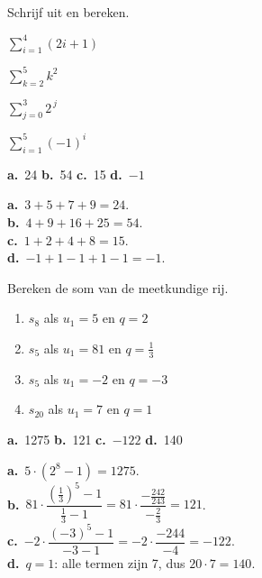 \begin{oefeningen}
\begin{oefening}[1]\label{oef:h3-sigma}
Schrijf uit en bereken.
\begin{reeks}[4]
  \item $\displaystyle\sum_{i=1}^{4} (2i + 1)$
  \item $\displaystyle\sum_{k=2}^{5} k^2$
  \item $\displaystyle\sum_{j=0}^{3} 2^{\,j}$
  \item $\displaystyle\sum_{i=1}^{5} (-1)^i$
\end{reeks}
\begin{solution}
\textbf{a.}~24 \quad \textbf{b.}~54 \quad \textbf{c.}~15 \quad \textbf{d.}~$-1$
\end{solution}
\begin{fullsolution}
\textbf{a.}~$3+5+7+9=24$.\\
\textbf{b.}~$4+9+16+25=54$.\\
\textbf{c.}~$1+2+4+8=15$.\\
\textbf{d.}~$-1+1-1+1-1=-1$.
\end{fullsolution}
\end{oefening}

\begin{oefening}[1]\label{oef:h3-mrsom}
Bereken de som van de meetkundige rij.
\begin{enumerate}
  \item $s_8$ als $u_1 = 5$ en $q = 2$
  \item $s_5$ als $u_1 = 81$ en $q = \tfrac13$
  \item $s_5$ als $u_1 = -2$ en $q = -3$
  \item $s_{20}$ als $u_1 = 7$ en $q = 1$
\end{enumerate}
\begin{solution}
\textbf{a.}~1275 \quad \textbf{b.}~121 \quad \textbf{c.}~$-122$ \quad \textbf{d.}~140
\end{solution}
\begin{fullsolution}
\textbf{a.}~$5\cdot(2^8-1)=1275$.\\
\textbf{b.}~$81\cdot\dfrac{(\tfrac13)^5-1}{\tfrac13-1}=81\cdot\dfrac{-\tfrac{242}{243}}{-\tfrac23}=121$.\\
\textbf{c.}~$-2\cdot\dfrac{(-3)^5-1}{-3-1}=-2\cdot\dfrac{-244}{-4}=-122$.\\
\textbf{d.}~$q=1$: alle termen zijn 7, dus $20\cdot 7=140$.
\end{fullsolution}
\end{oefening}


\end{oefeningen}
